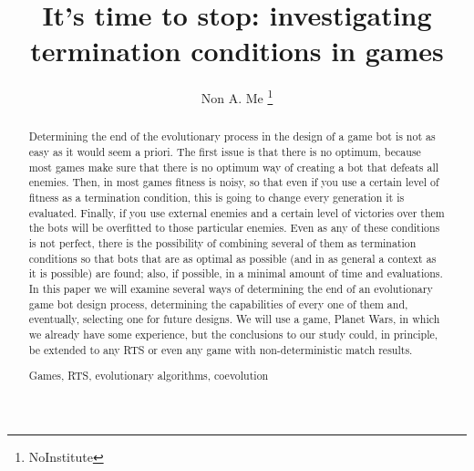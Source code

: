 \documentclass[runningheads,a4paper]{llncs}
\newcommand{\keywords}[1]{\par\addvspace\baselineskip
\noindent\keywordname\enspace\ignorespaces#1}
\begin{document}
\mainmatter  %

\title{It's time to stop: investigating termination conditions in games}


%
%
\author{Non A. Me%
\thanks{NoInstitute}}
%


%
%

\maketitle


\begin{abstract}
Determining the end of the evolutionary process in the design of a
game bot is not as easy as it would seem a priori. The first issue is
that there is no optimum, because most games make sure that there is
no optimum way of creating a bot that defeats all enemies. Then, in
most games fitness is noisy, so that even if you use a certain level
of fitness as a termination condition, this is going to change every
generation it is evaluated. Finally, if you use external enemies and a
certain level of victories over them the bots will be overfitted to
those particular enemies. Even as any of these conditions is not
perfect, there is the possibility of combining several of them as
termination conditions so that bots that are as optimal as possible
(and in as general a context as it is possible) are found; also, if
possible, in a minimal amount of time and evaluations. In this paper
we will examine several ways of determining the end of an evolutionary
game bot design process, determining the capabilities of every one of
them and, eventually, selecting one for future designs. We will use a
game, Planet Wars, in which we already have some experience, but the
conclusions to our study could, in principle, be extended to any RTS
or even any game with non-deterministic match results. 
\keywords{Games, RTS, evolutionary algorithms, coevolution}
\end{abstract}
\end{document}
